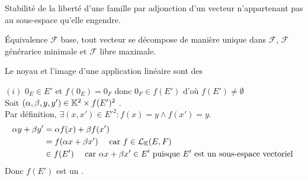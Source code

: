 \documentclass{article}
\begin{document}
\begin{question_kholle}{Stabilité de la liberté d’une famille par adjonction d’un vecteur n’appartenant pas au sous-espace qu’elle engendre.}
\end{question_kholle}

\begin{question_kholle}{Équivalence $\mathcal{F}$ base, tout vecteur se décompose de manière unique dans $\mathcal{F}$, $\mathcal{F}$ générarice minimale et $\mathcal{F}$ libre maximale.}
\end{question_kholle}

\begin{question_kholle}
	[Soit $f \in \mathcal{L}_\K(E, F)$.
		\begin{equation}
			\begin{aligned}
				\ker f & = \left\{ x \in E \;|\; f(x) = 0_F \right\} = f^{-1} (\{0_F\}) \\
				\Im f  & = \left\{ y \in F \;|\; \exists x \in E : f(x) = y \right\}
			\end{aligned}
		\end{equation}
		Nous démontrerons le résultat plus général suivant :
		\begin{propositions}
			\item $f(E')$ est un \sev de $F$.
			\item $f^{-1}(F')$ est un \sev de $E$.
		\end{propositions}
	]
	{Le noyau et l'image d'une application linéaire sont des \sevs}

	$(i)$ $0_E \in E'$ et $f(0_E) = 0_F$ donc $0_F \in f(E')$ d'où $f(E') \neq \emptyset$ \\
	Soit $(\alpha, \beta, y, y') \in \mathbb K^2 \times f(E')^2$ \fqs. \\
	Par définition, $\exists (x, x') \in E'^2 : f(x) = y \wedge f(x') = y$.
	\begin{equation*}
		\begin{aligned}
			\alpha y + \beta y'
			 & = \alpha f(x) + \beta f(x')                                                                     \\
			 & = f( \alpha x + \beta x' ) \quad \text{ car } f \in \mathcal{L}_{\mathbb K}(E, F)                        \\
			 & \in f(E') \quad \text{ car } \alpha x + \beta x' \in E' \text{ puisque } E' \text{ est un sous-espace vectoriel }
		\end{aligned}
	\end{equation*}
	Donc $f(E')$ est un \sev.


\end{question_kholle}
\end{document}
